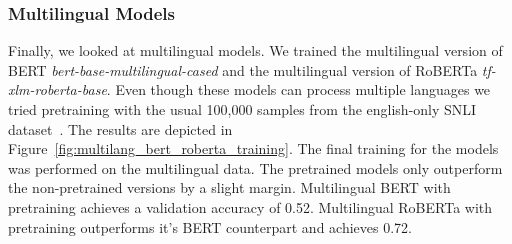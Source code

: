 \documentclass[acmsmall,nonacm]{acmart}
\begin{document}
\newpage
\subsubsection{Multilingual Models} \label{sec:multilingual}
Finally, we looked at multilingual models. We trained the multilingual version of BERT \textit{bert-base-multilingual-cased} and the multilingual version of RoBERTa \textit{tf-xlm-roberta-base}. Even though these models can process multiple languages we tried pretraining with the usual 100,000 samples from the english-only SNLI dataset~\cite{snli-bowman2015}. The results are depicted in Figure~\ref{fig:multilang_bert_roberta_training}. The final training for the models was performed on the multilingual data. The pretrained models only outperform the non-pretrained versions by a slight margin. Multilingual BERT with pretraining achieves a validation accuracy of 0.52. Multilingual RoBERTa with pretraining outperforms it's BERT counterpart and achieves 0.72.
\end{document}
